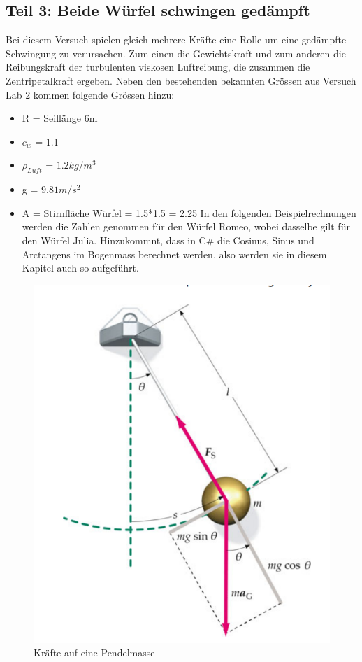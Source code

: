 \documentclass[../main.tex]{subfiles}
\begin{document}
\subsection{Teil 3: Beide Würfel schwingen gedämpft}
Bei diesem Versuch spielen gleich mehrere Kräfte eine Rolle um eine gedämpfte Schwingung zu verursachen. Zum einen die Gewichtskraft und zum anderen die Reibungskraft der turbulenten viskosen Luftreibung, die zusammen die Zentripetalkraft ergeben.
Neben den bestehenden bekannten Grössen aus Versuch Lab 2 kommen folgende Grössen hinzu:
\begin{itemize}
	\item R = Seillänge 6m
	\item $c_w$ = 1.1
	\item $\rho_{Luft}$ = $1.2kg/m^3$
	\item g = $9.81 m/s^2$
	\item A = Stirnfläche Würfel = 1.5*1.5 = 2.25
In den folgenden Beispielrechnungen werden die Zahlen genommen für den Würfel Romeo, wobei dasselbe gilt für den Würfel Julia. 	Hinzukommnt, dass in C\# die Cosinus, Sinus und Arctangens im Bogenmass berechnet werden, also werden sie in diesem Kapitel auch so aufgeführt.
\end{itemize}
     \begin{figure}[H]
               \begin{center}
                   \centerline{\includegraphics[width=155mm]{./images/Lab3Unity/KraeftePendel.png}}
                   \caption{Kräfte auf eine Pendelmasse \cite{tiplerpaula.PhysikFurStudierende}}
                   \label{fig:Pendel}
               \end{center}
     \end{figure}
\end{document}
